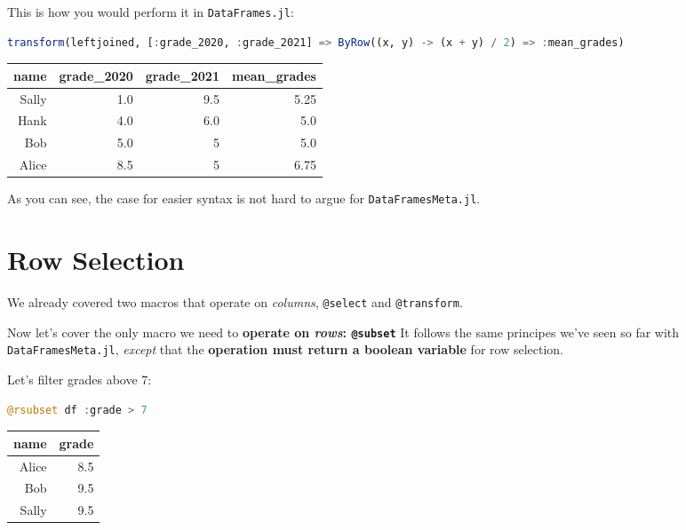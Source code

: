 \documentclass[
  notoc %
]{tufte-book}
\newcommand{\passthrough}[1]{#1}
\begin{document}
This is how you would perform it in
\passthrough{\lstinline!DataFrames.jl!}:

\begin{lstlisting}[language=Julia]
transform(leftjoined, [:grade_2020, :grade_2021] => ByRow((x, y) -> (x + y) / 2) => :mean_grades)
\end{lstlisting}

\begin{longtable}[]{@{}rrrr@{}}
\toprule
name & grade\_2020 & grade\_2021 & mean\_grades \\
\midrule
\endhead
Sally & 1.0 & 9.5 & 5.25 \\
Hank & 4.0 & 6.0 & 5.0 \\
Bob & 5.0 & 5 & 5.0 \\
Alice & 8.5 & 5 & 6.75 \\
\bottomrule
\end{longtable}

As you can see, the case for easier syntax is not hard to argue for
\passthrough{\lstinline!DataFramesMeta.jl!}.

\hypertarget{sec:dataframesmeta_subset}{%
\section{Row Selection}\label{sec:dataframesmeta_subset}}

We already covered two macros that operate on \emph{columns},
\passthrough{\lstinline!@select!} and
\passthrough{\lstinline!@transform!}.

Now let's cover the only macro we need to \textbf{operate on
\emph{rows}: \passthrough{\lstinline!@subset!}} It follows the same
principes we've seen so far with
\passthrough{\lstinline!DataFramesMeta.jl!}, \emph{except} that the
\textbf{operation must return a boolean variable} for row selection.

Let's filter grades above 7:

\begin{lstlisting}[language=Julia]
@rsubset df :grade > 7
\end{lstlisting}

\begin{longtable}[]{@{}rr@{}}
\toprule
name & grade \\
\midrule
\endhead
Alice & 8.5 \\
Bob & 9.5 \\
Sally & 9.5 \\
\bottomrule
\end{longtable}
\end{document}
